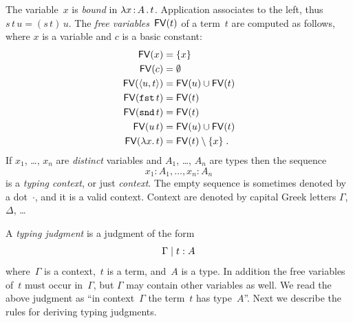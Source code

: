 %
The variable~$x$ is \emph{bound} in $\lambda x \,{:}\, A\,.\,t$. Application
associates to the left, thus $s\, t\, u = (s\, t)\, u$. The \emph{free
  variables}~$\mathsf{FV}(t)$ of a term~$t$ are computed as follows, where $x$
is a variable and $c$ is a basic constant:
%
\begin{align*}
  \mathsf{FV}(x) &= \{x\} \\
  \mathsf{FV}(c) &= \emptyset \\
  \mathsf{FV}(\langle u, t \rangle) &= \mathsf{FV}(u) \cup \mathsf{FV}(t) \\
  \mathsf{FV}(\mathtt{fst}\,t) &= \mathsf{FV}(t) \\
  \mathsf{FV}(\mathtt{snd}\,t) &= \mathsf{FV}(t) \\
  \mathsf{FV}(u \, t) &= \mathsf{FV}(u) \cup \mathsf{FV}(t) \\
  \mathsf{FV}(\lambda x .\,t) &= \mathsf{FV}(t) \setminus \{x\} \;.
\end{align*}
%
If $x_1$, \dots, $x_n$ are \emph{distinct} variables and $A_1$,
\dots, $A_n$ are types then the sequence
%
\begin{equation*}
  x_1 : A_1, \ldots, x_n : A_n
\end{equation*}
%
is a \emph{typing context}, or just \emph{context}. The empty sequence
is sometimes denoted by a dot~$\cdot$, and it is a valid context.
Context are denoted by capital Greek letters $\Gamma$, $\Delta$, \dots

A \emph{typing judgment} is a judgment of the form
%
\begin{equation*}
  \Gamma \mid t : A
\end{equation*}
%
where~$\Gamma$ is a context,~$t$ is a term, and~$A$ is a type. In
addition the free variables of~$t$ must occur in~$\Gamma$, but
$\Gamma$ may contain other variables as well. We read the above
judgment as ``in context~$\Gamma$ the term~$t$ has type~$A$''.
Next we describe the rules for deriving typing judgments.

